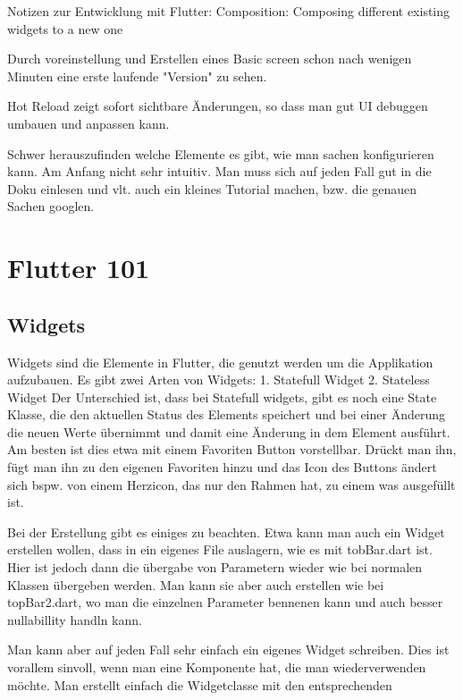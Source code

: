 Notizen zur Entwicklung mit Flutter:
Composition: Composing different existing widgets to a new one

Durch voreinstellung und Erstellen eines Basic screen schon nach wenigen Minuten eine erste laufende "Version" zu sehen.

Hot Reload zeigt sofort sichtbare Änderungen, so dass man gut UI debuggen umbauen und anpassen kann.

Schwer herauszufinden welche Elemente es gibt, wie man sachen konfigurieren kann. Am Anfang nicht sehr intuitiv. Man muss sich auf jeden Fall gut in die Doku einlesen und vlt. auch ein kleines Tutorial machen, bzw. die genauen Sachen googlen.



\section{Flutter 101}
\subsection{Widgets}
Widgets sind die Elemente in Flutter, die genutzt werden um die Applikation aufzubauen.
Es gibt zwei Arten von Widgets:
1. Statefull Widget
2. Stateless Widget
Der Unterschied ist, dass bei Statefull widgets, gibt es noch eine State Klasse, die den aktuellen Status des Elements speichert und bei einer Änderung die neuen Werte übernimmt und damit eine Änderung in dem Element ausführt. Am besten ist dies etwa mit einem Favoriten Button vorstellbar. Drückt man ihn, fügt man ihn zu den eigenen Favoriten hinzu und das Icon des Buttons ändert sich bspw. von einem Herzicon, das nur den Rahmen hat, zu einem was ausgefüllt ist.

Bei der Erstellung gibt es einiges zu beachten. 
Etwa kann man auch ein Widget erstellen wollen, dass in ein eigenes File auslagern, wie es mit tobBar.dart ist. Hier ist jedoch dann die übergabe von Parametern wieder wie bei normalen Klassen übergeben werden. Man kann sie aber auch erstellen wie bei topBar2.dart, wo man die einzelnen Parameter bennenen kann und auch besser nullabillity handln kann.

Man kann aber auf jeden Fall sehr einfach ein eigenes Widget schreiben. Dies ist vorallem sinvoll, wenn man eine Komponente hat, die man wiederverwenden möchte. Man erstellt einfach die Widgetclasse mit den entsprechenden 
